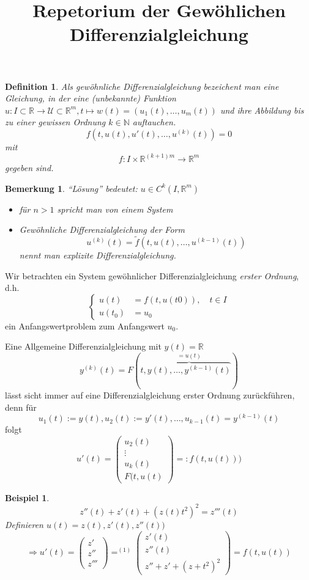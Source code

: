 \documentclass[11pt]{article}
\title{Repetorium der Gew\"ohlichen Differenzialgleichung}
\newcommand{\RR}{\mathbb{R}}
\newcommand{\NN}{\mathbb{N}}
\newcommand{\UU}{\mathcal{U}}
\newcounter{myCounter}[section]
\newtheorem{Def}[myCounter]{Definition}
\newtheorem{Bem}[myCounter]{Bemerkung}
\newtheorem{Bsp}[myCounter]{Beispiel}
\begin{document}
\maketitle

\begin{Def}
  Als gew\"ohnliche Differenzialgleichung bezeichent man eine Gleichung, in der eine (unbekannte)
  Funktion $u: I \subset \RR \rightarrow \UU \subset \RR^m , t \mapsto w(t)=
  (u_1(t), \dotsc, u_m(t))$ und ihre Abbildung bis zu einer gewissen Ordnung $
  k \in \NN$ auftauchen. \[
    f(t,u(t), u'(t), \dotsc, u^{(k)}(t)) = 0 \]
  mit \[
    f:I \times \RR^{(k+1)m} \rightarrow \RR^m \]
  gegeben sind.
\end{Def}

\begin{Bem}
  ``L\"osung'' bedeutet: $u\in C^k(I,\RR^m)$
  \begin{itemize}
  \item f\"ur $n > 1$ spricht man von einem System
  \item Gew\"ohnliche Differenzialgleichung der Form \[
    u^{(k)}(t) = \tilde{f}(t,u(t),\dotsc,u^{(k-1)}(t)) \]
    nennt man \emph{explizite} Differenzialgleichung.
  \end{itemize}
\end{Bem}
Wir betrachten ein System gew\"ohnlicher Differenzialgleichung \emph{erster Ordnung}, d.h.\[
  \left\{\begin{aligned} u(t) &= f(t,u(t0)), \quad t \in I \\ u(t_0) &= u_0
  \end{aligned} \right. \]
ein Anfangswertproblem zum Anfangswert $u_0$.

Eine Allgemeine Differenzialgleichung mit $y(t) = \RR$ \[
  y^{(k)}(t) = F(t,\overbrace{y(t),\dotsc,y^{(k-1)}(t)}^{=u(t)}) \]
l\"asst sicht immer auf eine Differenzialgleichung erster Ordnung zur\"uckf\"uhren, denn f\"ur
\[ u_1(t):=y(t), u_2(t) := y'(t), \dotsc, u_{k-1}(t)=y^{(k-1)}(t) \] folgt \[
  u'(t) = \begin{pmatrix} u_2(t) \\ \vdots \\ u_k(t) \\ F(t,u(t) \end{pmatrix} =
: f(t,u(t))) \]

\begin{Bsp}
\[ z''(t) + z'(t) + (z(t)t^2)^2 = z'''(t) \tag{1} \]
Definieren $u(t) = z(t), z'(t), z''(t) )$ \[
  \Rightarrow u'(t) = \begin{pmatrix} z' \\ z'' \\ z''' \end{pmatrix}  
  \mathop{=}^{(1)} \begin{pmatrix} z'(t) \\ z''(t) \\ z'' + z' + (z + t^2)^2
  \end{pmatrix} = f(t,u(t)) \]
\end{Bsp}
\end{document}
